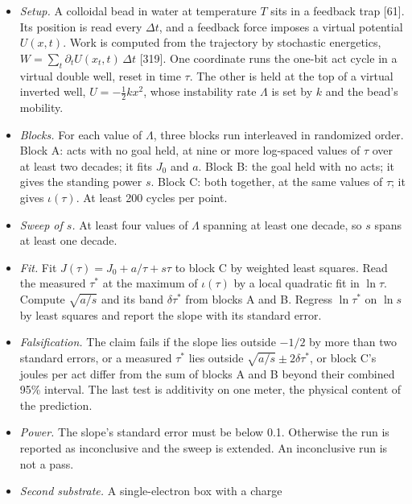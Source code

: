 \documentclass[
  10pt,
]{article}
\providecommand{\tightlist}{%
  \setlength{\itemsep}{0pt}\setlength{\parskip}{0pt}}
\begin{document}
\begin{itemize}
  \begin{itemize}
  \tightlist
  \item
    \emph{Setup.} A colloidal bead in water at temperature \(T\) sits in
    a feedback trap {[}61{]}. Its position is read every \(\Delta t\),
    and a feedback force imposes a virtual potential \(U(x, t)\). Work
    is computed from the trajectory by stochastic energetics,
    \(W = \sum_t \partial_t U(x_t, t)\,\Delta t\) {[}319{]}. One
    coordinate runs the one-bit act cycle in a virtual double well,
    reset in time \(\tau\). The other is held at the top of a virtual
    inverted well, \(U = -\tfrac{1}{2}k x^2\), whose instability rate
    \(\Lambda\) is set by \(k\) and the bead's mobility.
  \item
    \emph{Blocks.} For each value of \(\Lambda\), three blocks run
    interleaved in randomized order. Block A: acts with no goal held, at
    nine or more log-spaced values of \(\tau\) over at least two
    decades; it fits \(J_0\) and \(a\). Block B: the goal held with no
    acts; it gives the standing power \(s\). Block C: both together, at
    the same values of \(\tau\); it gives \(\iota(\tau)\). At least 200
    cycles per point.
  \item
    \emph{Sweep of \(s\).} At least four values of \(\Lambda\) spanning
    at least one decade, so \(s\) spans at least one decade.
  \item
    \emph{Fit.} Fit \(J(\tau) = J_0 + a/\tau + s\tau\) to block C by
    weighted least squares. Read the measured \(\tau^*\) at the maximum
    of \(\iota(\tau)\) by a local quadratic fit in \(\ln\tau\). Compute
    \(\sqrt{a/s}\) and its band \(\delta\tau^*\) from blocks A and B.
    Regress \(\ln\tau^*\) on \(\ln s\) by least squares and report the
    slope with its standard error.
  \item
    \emph{Falsification.} The claim fails if the slope lies outside
    \(-1/2\) by more than two standard errors, or a measured \(\tau^*\)
    lies outside \(\sqrt{a/s} \pm 2\delta\tau^*\), or block C's joules
    per act differ from the sum of blocks A and B beyond their combined
    95\% interval. The last test is additivity on one meter, the
    physical content of the prediction.
  \item
    \emph{Power.} The slope's standard error must be below 0.1.
    Otherwise the run is reported as inconclusive and the sweep is
    extended. An inconclusive run is not a pass.
  \item
    \emph{Second substrate.} A single-electron box with a charge

\end{itemize}
\end{itemize}
\end{document}
